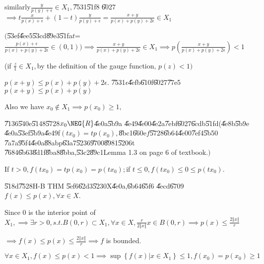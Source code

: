 \documentclass{article}
\begin{document}
similarly$\frac{y}{p\left( y\right) +\epsilon }\in X_{1},$\U{7531}\U{51f8}%
\U{6027}$\implies t\frac{x}{p\left( x\right) +\epsilon }+\left( 1-t\right) 
\frac{y}{p\left( y\right) +\epsilon }=\frac{x+y}{p\left( x\right) +p\left(
y\right) +2\epsilon }\in X_{1}$

$($\U{53ef}\U{4ee5}\U{53cd}\U{89e3}\U{51fa}$t$=$\frac{p\left( x\right)
+\epsilon }{p\left( x\right) +p\left( y\right) +2\epsilon }\in \left(
0,1\right) )\implies \frac{x+y}{p\left( x\right) +p\left( y\right)
+2\epsilon }\in X_{1}\implies p\left( \frac{x+y}{p\left( x\right) +p\left(
y\right) +2\epsilon }\right) <1$

(if $\frac{z}{1}\in X_{1},$by the definition of the gauge function, $p\left(
z\right) <1)$

$p\left( x+y\right) \leq p\left( x\right) +p\left( y\right) +2\epsilon .$%
\U{7531}$\epsilon $\U{4efb}\U{610f}\U{6027}\U{77e5}$p\left( x+y\right) \leq
p\left( x\right) +p\left( y\right) $

Also we have $x_{0}\notin X_{1}\implies p\left( x_{0}\right) \geq 1,$

\bigskip \U{7136}\U{540e}\U{5148}\U{5728}$x_{0}\NEG{R}$\U{4e0a}\U{5b9a}%
\U{4e49}\U{4e00}\U{4e2a}\U{7ebf}\U{6027}\U{6cdb}\U{51fd}(\U{4e8b}\U{5b9e}%
\U{4e0a}\U{53ef}\U{5b9a}\U{4e49}f$\left( tx_{0}\right) =tp\left(
x_{0}\right) ,$\U{8bc1}\U{660e}$f$\U{5728}\U{6b64}\U{4e00}\U{7ef4}\U{5b50}%
\U{7a7a}\U{95f4}\U{4e0a}\U{88ab}p\U{63a7}\U{5236}\U{9700}\U{8981}\U{5206}t%
\U{7684}\U{6b63}\U{8d1f}\U{8ba8}\U{8bba},\U{53c2}\U{89c1}Lemma 1.3 on page 6
of textbook.$)$

If $t>0,f\left( tx_{0}\right) =tp\left( x_{0}\right) =p\left( tx_{0}\right)
; $if $t\leq 0,f\left( tx_{0}\right) \leq 0\leq p\left( tx_{0}\right) .$

\U{518d}\U{7528}H-B THM \U{5ef6}\U{62d3}\U{5230}X\U{4e0a},\U{6b64}\U{65f6}%
\U{4ecd}\U{6709}$f(x)\leq p\left( x\right) ,\forall x\in X$.

Since $0$ is the interior point of $X_{1},\implies \exists r>0,s.t.B\left(
0,r\right) \subset X_{1},\forall x\in X,\frac{r}{2\left\Vert x\right\Vert }%
x\in B\left( 0,r\right) \implies p\left( x\right) \leq \frac{2\left\Vert
x\right\Vert }{r}$

$\implies f\left( x\right) \leq p\left( x\right) \leq \frac{2\left\Vert
x\right\Vert }{r}\implies f$ is bounded.

\bigskip $\forall x\in X_{1},f\left( x\right) \leq p\left( x\right)
<1\implies \sup \left\{ f\left( x\right) |x\in X_{1}\right\} \leq 1,f\left(
x_{0}\right) =p\left( x_{0}\right) \geq 1$
\end{document}
